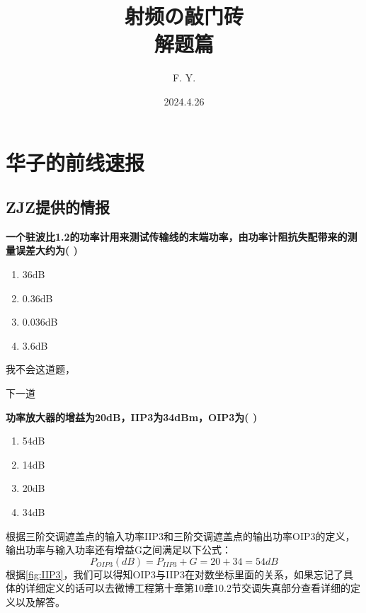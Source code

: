 \documentclass[10pt,openany]{book}
\title{\color{subsectioncolor}射频の敲门砖\\ 
\color{blue}\textbf{解题篇}}
\author{F. Y.}
\date{2024.4.26}
\begin{document}
\frontmatter

\maketitle


\tableofcontents

\mainmatter

\chapter{华子的前线速报}

\section{ZJZ提供的情报}{
  \begin{myexercise}
    \textbf{一个驻波比1.2的功率计用来测试传输线的末端功率，由功率计阻抗失配带来的测量误差大约为( )}
    \begin{enumerate}[label=\Alph*.]
      \item 36dB
      \item 0.36dB
      \item 0.036dB
      \item 3.6dB
    \end{enumerate}
  \end{myexercise}
  \begin{solution}
    我不会这道题，

    下一道
  \end{solution}

  \begin{myexercise}
    \textbf{功率放大器的增益为20dB，IIP3为34dBm，OIP3为( )}
    \begin{enumerate}[label=\Alph*.]
      \item 54dB
      \item 14dB
      \item 20dB
      \item 34dB
    \end{enumerate}
  \end{myexercise}

  \begin{solution}
    根据三阶交调遮盖点的输入功率IIP3和三阶交调遮盖点的输出功率OIP3的定义，输出功率与输入功率还有增益G之间满足以下公式：
    \begin{equation*}
      P_{OIP3}( dB) =P_{IIP3} +G=20+34=54dB
    \end{equation*}
    根据\cref{fig:IIP3}，我们可以得知OIP3与IIP3在对数坐标里面的关系，如果忘记了具体的详细定义的话可以去微博工程第十章第10章10.2节交调失真部分查看详细的定义以及解答。
    

\end{solution}}
\end{document}
